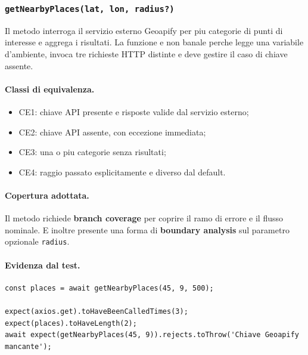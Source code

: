 \documentclass[a4paper,11pt]{article}
\begin{document}
\subsubsection{\texttt{getNearbyPlaces(lat, lon, radius?)}}
Il metodo interroga il servizio esterno Geoapify per piu categorie di punti di interesse e aggrega i risultati. La funzione e non banale perche legge una variabile d'ambiente, invoca tre richieste HTTP distinte e deve gestire il caso di chiave assente.

\paragraph{Classi di equivalenza.}
\begin{itemize}
  \item CE1: chiave API presente e risposte valide dal servizio esterno;
  \item CE2: chiave API assente, con eccezione immediata;
  \item CE3: una o piu categorie senza risultati;
  \item CE4: raggio passato esplicitamente e diverso dal default.
\end{itemize}

\paragraph{Copertura adottata.}
Il metodo richiede \textbf{branch coverage} per coprire il ramo di errore e il flusso nominale. E inoltre presente una forma di \textbf{boundary analysis} sul parametro opzionale \texttt{radius}.

\paragraph{Evidenza dal test.}
\begin{lstlisting}[style=projectcode]
const places = await getNearbyPlaces(45, 9, 500);

expect(axios.get).toHaveBeenCalledTimes(3);
expect(places).toHaveLength(2);
await expect(getNearbyPlaces(45, 9)).rejects.toThrow('Chiave Geoapify mancante');
\end{lstlisting}
\end{document}
